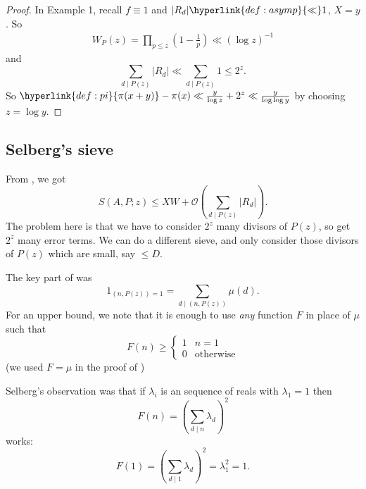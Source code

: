 \documentclass{article}
\newcommand{\bigO}{\mathcal{O}}
\begin{document}
\begin{proof}
  In Example 1, recall $f \equiv 1$ and $|R_d| \hyperlink{def:asymp}{\ll} 1$, $X = y$.
  So
  \begin{align*}
    W_P(z) = \prod_{p \leq z} \left(1 - \frac 1p\right) \ll (\log z)^{-1}
  \end{align*}
  and
  \begin{equation*}
    \sum_{d \mid P(z)} |R_d| \ll \sum_{d \mid P(z)} 1 \leq 2^z.
  \end{equation*}
  So $\hyperlink{def:pi}{\pi(x+y)} - \pi(x) \ll \frac{y}{\log z} + 2^z \ll \frac{y}{\log \log y} $ by choosing $z = \log y$.
\end{proof}

\subsection{Selberg's sieve}
\newlec
From , we got
\begin{equation*}
  S(A,P;z) \leq XW + \bigO\left(\sum_{d \mid P(z)} |R_d|\right).
\end{equation*}
The problem here is that we have to consider $2^z$ many divisors of $P(z)$, so get $2^z$ many error terms.
We can do a different sieve, and only consider those divisors of $P(z)$ which are small, say $\leq D$.

The key part of  was
\begin{equation*}
  1_{(n,P(z)) = 1} = \sum_{d \mid (n, P(z))} \mu(d).
\end{equation*}
For an upper bound, we note that it is enough to use \emph{any} function $F$ in place of $\mu$ such that
\begin{equation*}
  F(n) \geq
  \begin{cases}
    1 & n=1 \\
    0 & \text{otherwise}
  \end{cases}
\end{equation*}
(we used $F=\mu$ in the proof of )

Selberg's observation was that if $\lambda_i$ is an sequence of reals with $\lambda_1 = 1$ then
\begin{equation*}
  F(n) = \left(\sum_{d \mid n} \lambda_d\right)^2
\end{equation*}
works:
\begin{equation*}
  F(1) = \left(\sum_{d \mid 1} \lambda_d\right)^2 = \lambda_1^2 = 1.
\end{equation*}
\end{document}
